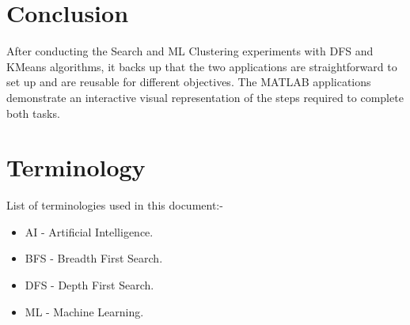 \documentclass[conference]{IEEEtran}
\begin{document}
    \section{Conclusion}
      After conducting the Search and ML Clustering experiments with DFS and KMeans algorithms, it backs up that the two applications are straightforward to set up and are reusable for different objectives. The MATLAB applications demonstrate an interactive visual representation of the steps required to complete both tasks.

    \section{Terminology}
      List of terminologies used in this document:-
      \begin{itemize}
        \item AI - Artificial Intelligence.
        \item BFS - Breadth First Search.
        \item DFS - Depth First Search.
        \item ML - Machine Learning.
      \end{itemize}
      
  \nocite{*}
	\renewcommand\refname{\section{Reference List}}
	\small{
    }
\end{document}
